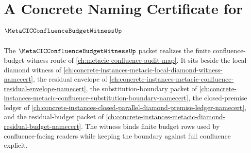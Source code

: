 \chapter{A Concrete Naming Certificate for $\MetaCICConfluenceBudgetWitnessUp$}
\label{ch:concrete-instances-metacic-confluence-budget-witness-namecert}

The $\MetaCICConfluenceBudgetWitnessUp$ packet realizes the finite confluence-budget witness route of \autoref{ch:metacic-confluence-audit-map}. It sits beside the local diamond witness of \autoref{ch:concrete-instances-metacic-local-diamond-witness-namecert}, the residual envelope of \autoref{ch:concrete-instances-metacic-confluence-residual-envelope-namecert}, the substitution-boundary packet of \autoref{ch:concrete-instances-metacic-confluence-substitution-boundary-namecert}, the closed-premise ledger of \autoref{ch:concrete-instances-closed-parallel-diamond-premise-ledger-namecert}, and the residual-budget packet of \autoref{ch:concrete-instances-metacic-diamond-residual-budget-namecert}. The witness binds finite budget rows used by confluence-facing readers while keeping the boundary against full confluence explicit.

